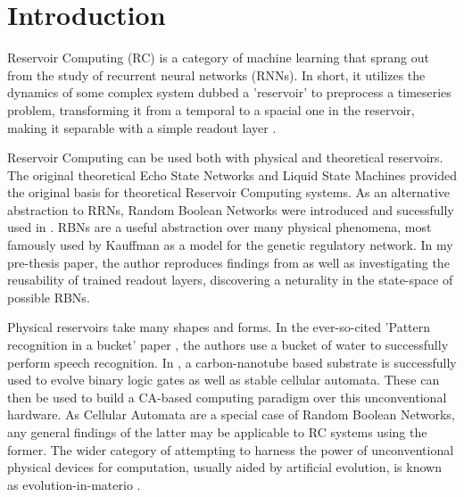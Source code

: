 \chapter{Introduction}

Reservoir Computing (RC) is a category of machine learning that sprang out from the study of recurrent neural networks (RNNs).
In short, it utilizes the dynamics of some complex system dubbed a 'reservoir' to preprocess a timeseries problem,
transforming it from a temporal to a spacial one in the reservoir,
making it separable with a simple readout layer \cite{lukovsevivcius2012reservoir}.

Reservoir Computing can be used both with physical and theoretical reservoirs.
The original theoretical Echo State Networks \cite{jaeger2002adaptive} and Liquid State Machines \cite{natschlager2002liquid} provided the original basis for theoretical Reservoir Computing systems.
As an alternative abstraction to RRNs,
Random Boolean Networks \cite{gershenson2004introduction} were introduced and sucessfully used in \cite{rbn-reservoir}.
RBNs are a useful abstraction over many physical phenomena, most famously used by Kauffman \cite{kauffman1969metabolic} as a model for the genetic regulatory network.
In my pre-thesis paper, the author reproduces findings from \cite{rbn-reservoir} as well as investigating the reusability of trained readout layers,
discovering a neturality in the state-space of possible RBNs.

Physical reservoirs take many shapes and forms.
In the ever-so-cited 'Pattern recognition in a bucket' paper \cite{fernando2003pattern},
the authors use a bucket of water to successfully perform speech recognition.
In \cite{farstad2016towards},
a carbon-nanotube based substrate is successfully used to evolve binary logic gates as well as stable cellular automata.
These can then be used to build a CA-based computing paradigm over this unconventional hardware.
As Cellular Automata are a special case of Random Boolean Networks,
any general findings of the latter may be applicable to RC systems using the former.
The wider category of attempting to harness the power of unconventional physical devices for computation,
usually aided by artificial evolution,
is known as evolution-in-materio \cite{miller2002evolution}.

